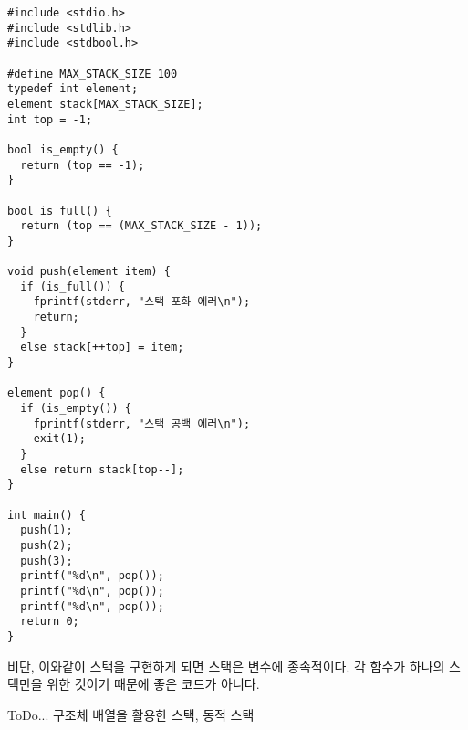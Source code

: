\documentclass[../note.tex]{subfiles}
\begin{document}
\begin{verbatim}
#include <stdio.h>
#include <stdlib.h>
#include <stdbool.h>

#define MAX_STACK_SIZE 100
typedef int element;
element stack[MAX_STACK_SIZE];
int top = -1;

bool is_empty() {
  return (top == -1);
}

bool is_full() {
  return (top == (MAX_STACK_SIZE - 1));
}

void push(element item) {
  if (is_full()) {
    fprintf(stderr, "스택 포화 에러\n");
    return;
  }
  else stack[++top] = item;
}

element pop() {
  if (is_empty()) {
    fprintf(stderr, "스택 공백 에러\n");
    exit(1);
  }
  else return stack[top--];
}

int main() {
  push(1);
  push(2);
  push(3);
  printf("%d\n", pop());
  printf("%d\n", pop());
  printf("%d\n", pop());
  return 0;
}
\end{verbatim}
비단, 이와같이 스택을 구현하게 되면 스택은 변수에 종속적이다. 각 함수가 하나의 스택만을 위한 것이기 때문에 좋은 코드가 아니다.
% 

ToDo...
구조체 배열을 활용한 스택, 동적 스택
\end{document}
